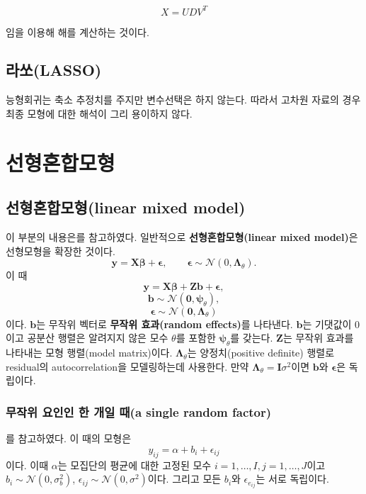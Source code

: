 \documentclass[b5paper,]{scrbook}
\theoremstyle{plain}
\theoremstyle{definition}
\numberwithin{equation}{section}
\begin{document}
\[X=UDV^{T}\]

임을 이용해 해를 계산하는 것이다.

\hypertarget{lasso}{%
\section{라쏘(LASSO)}\label{lasso}}

능형회귀는 축소 추정치를 주지만 변수선택은 하지 않는다. 따라서 고차원 자료의 경우 최종 모형에 대한 해석이 그리 용이하지 않다.

\hypertarget{lmm}{%
\chapter{선형혼합모형}\label{lmm}}

\hypertarget{linear-mixed-model}{%
\section{선형혼합모형(linear mixed model)}\label{linear-mixed-model}}

이 부분의 내용은\citep{Wood2006}를 참고하였다. 일반적으로 \textbf{선형혼합모형(linear mixed model)}은 선형모형을 확장한 것이다.
\[\mathbf{y}=\mathbf{X}\boldsymbol{\beta}+\boldsymbol{\epsilon}, \qquad{\boldsymbol{\epsilon}\sim\mathcal{N}(0,\boldsymbol{\Lambda}_{\theta})}.\]
이 때
\[\mathbf{y}=\mathbf{X}\boldsymbol{\beta}+\mathbf{Zb}+\boldsymbol{\epsilon},\]
\[\mathbf{b}\sim\mathcal{N}(\mathbf{0},\boldsymbol{\psi}_{\theta}),\]
\[\boldsymbol{\epsilon}\sim\mathcal{N}(\mathbf{0},\boldsymbol{\Lambda}_{\theta})\]
이다. \(\mathbf{b}\)는 무작위 벡터로 \textbf{무작위 효과(random effects)}를 나타낸다. \(\mathbf{b}\)는 기댓값이 0이고 공분산 행렬은 알려지지 않은 모수 \(\theta\)를 포함한 \(\boldsymbol{\psi}_{\theta}\)를 갖는다. \(\mathbf{Z}\)는 무작위 효과를 나타내는 모형 행렬(model matrix)이다. \(\boldsymbol{\Lambda}_{\theta}\)는 양정치(positive definite) 행렬로 residual의 autocorrelation을 모델링하는데 사용한다. 만약 \(\boldsymbol{\Lambda}_{\theta}=\mathbf{I}\sigma^{2}\)이면 \(\mathbf{b}\)와 \(\boldsymbol{\epsilon}\)은 독립이다.

\hypertarget{----a-single-random-factor}{%
\subsection{무작위 요인인 한 개일 때(a single random factor)}\label{----a-single-random-factor}}

\citep{Wood2006}를 참고하였다. 이 때의 모형은
\[y_{ij}=\alpha +b_{i}+\epsilon_{ij}\]
이다. 이때 \(\alpha\)는 모집단의 평균에 대한 고정된 모수 \(i=1,\ldots, I, j=1,\ldots, J\)이고 \(b_{i}\sim\mathcal{N}(0,\sigma_{b}^{2})\), \(\epsilon_{ij}\sim\mathcal{N}(0,\sigma^{2})\)이다. 그리고 모든 \(b_{i}\)와 \(\epsilon_{e_{ij}}\)는 서로 독립이다.
\end{document}
